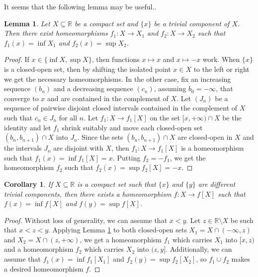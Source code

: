 \documentclass[12pt,a4paper,leqno]{amsart}
\newtheorem{lem}[thm]{Lemma}
\newtheorem{cor}[thm]{Corollary}
\theoremstyle{definition}
\begin{document}
It seems that the following lemma may be useful..

\begin{lem}\label{le9} Let $X\subseteq \mathbb R $ be a compact set and $\{ x\}$ be a trivial component of $X$. Then there exist homeomorphisms $f_1\colon X\to X_1$ and $f_2\colon X\to X_2$ such that $f_1(x) = \inf X_1$ and $f_2(x) = \sup X_2$. \end{lem}
\begin{proof} If $x\in \{\inf X, \sup X\}$, then functions $x\mapsto x$ and $x\mapsto -x$ work. When $\{x\}$ is a closed-open set, then by shifting the isolated point $x\in X$  to the left or right we get the necessary homeomorphisms. In the other case, fix an increasing sequence $(b_n)$ and a decreasing sequence $(c_n)$, assuming  $b_0=-\infty$, that converge to $x$ and are contained in the complement of $X$. Let $(J_n)$ be a sequence of pairwise disjoint closed intervals contained in the complement of $X$ such that $c_n \in J_n$ for all $n$. 
Let $f_1\colon X\to f_1[X]$ on the set $[x, +\infty) \cap X$ be the identity and let $f_1$ shrink suitably and move each closed-open  set $(b_n, b_{n+1}) \cap X$ into $J_n$. Since the sets $(b_n,b_{n+1}) \cap X$ are closed-open in $X$ and the intervals $J_n$ are  disjoint with $X$, then $f_1\colon X \to f_1[X]$ is a homeomorphism such that 
$f_1(x)= \inf  f_1 [X] = x$. 
Putting $ f_2=-f_1$, we get the homeomorphism $f_2$ such that $f_2(x) =\sup  f_2 [X] = -x$. 
\end {proof}

\begin{cor}\label{c10} If $X\subseteq \mathbb R $ is a compact set such that   $\{ x\}$ and $\{y\}$ are different  trivial components, then  there exists a homeomorphism $f\colon X\to f[X]$  such that $f(x) = \inf f[X]$ and $f(y) = \sup f[X]$.  \end{cor}
\begin{proof} Without loss of generality, we can assume that $x<y$. Let $z\in \mathbb R \setminus X$ be such that $x<z<y$. Applying Lemma \ref{le9} to both closed-open sets 
$X_1=X \cap (-\infty,z)$ and  $X_2=X \cap (z,+\infty)$, we get a homeomorphism $f_1$  which carries $ X_1$ into  $[x,z)$ and a homeomorphism $f_2$ which carries 
$ X_2$ into  $(z,y]$. Additionally, we can assume that  $f_1(x) = \inf f_1[X_1]$ and  $f_2(y) = \sup f_2[X_2]$, so  $f_1 \cup f_2$ makes a desired homeomorphism $f$. \end{proof}
\end{document}
